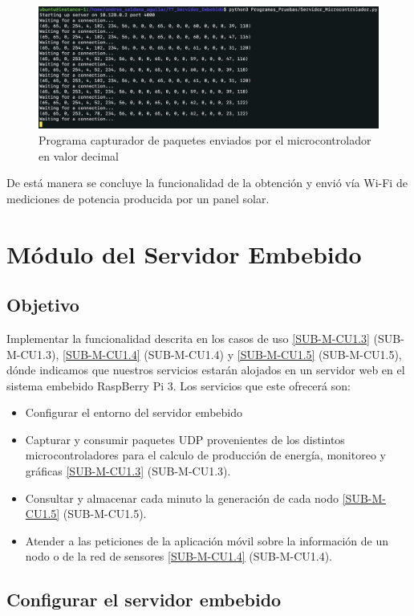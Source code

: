\begin{figure}[H]
	\centering
	\includegraphics[scale=.3]{Capitulo5/images/paquetes_recibidos.png}
	\caption{Programa capturador de paquetes enviados por el microcontrolador en valor decimal}
	\label{fig:respuesta sensor}
\end{figure} 


De está manera se concluye la funcionalidad de la obtención y envió vía Wi-Fi de mediciones de potencia producida por un panel solar.

\section{Módulo del Servidor Embebido}

\subsection{Objetivo}
Implementar la funcionalidad descrita en los casos de uso \ref{SUB-M-CU1.3} (SUB-M-CU1.3), \ref{SUB-M-CU1.4} (SUB-M-CU1.4) y \ref{SUB-M-CU1.5} (SUB-M-CU1.5), dónde indicamos que nuestros servicios estarán alojados en un servidor web en el sistema embebido RaspBerry Pi 3. Los servicios que este ofrecerá son:

\begin{itemize}
    \item Configurar el entorno del servidor embebido
    \item Capturar y consumir paquetes UDP provenientes de los distintos microcontroladores para el calculo de producción de energía, monitoreo y gráficas \ref{SUB-M-CU1.3} (SUB-M-CU1.3).
    \item Consultar y almacenar cada minuto la generación de cada nodo \ref{SUB-M-CU1.5} (SUB-M-CU1.5).
    \item Atender a las peticiones de la aplicación móvil sobre la información de un nodo o de la red de sensores \ref{SUB-M-CU1.4} (SUB-M-CU1.4).
\end{itemize}

\subsection{Configurar el servidor embebido}

